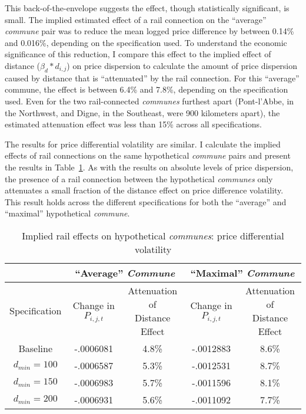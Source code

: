 \documentclass[12pt,twoside]{article}
\begin{document}
This back-of-the-envelope suggests the effect, though statistically significant, is small.
The implied estimated effect of a rail connection on the ``average'' \emph{commune} pair was to reduce the mean logged price difference by between 0.14\% and 0.016\%, depending on the specification used.
To understand the economic significance of this reduction, I compare this effect to the implied effect of distance ($\beta_d * d_{i,j}$) on price dispersion to calculate the amount of price dispersion caused by distance that is ``attenuated'' by the rail connection.
For this ``average'' commune, the effect is between 6.4\% and 7.8\%, depending on the specification used.
Even for the two rail-connected \emph{communes} furthest apart (Pont-l'Abbe, in the Northwest, and Digne, in the Southeast, were 900 kilometers apart), the estimated attenuation effect was less than 15\% across all specifications.

The results for price differential volatility are similar.
I calculate the implied effects of rail connections on the same hypothetical \emph{commune} pairs and present the results in Table~\ref{tab:treatment2}.
As with the results on absolute levels of price dispersion, the presence of a rail connection between the hypothetical \emph{communes} only attenuates a small fraction of the distance effect on price difference volatility.
This result holds across the different specifications for both the ``average'' and ``maximal'' hypothetical \emph{commune}.

\begin{table}[ht]
	\centering \caption{Implied rail effects on hypothetical \emph{communes}: price differential volatility} \label{tab:treatment2}
	\begin{tabular}{ |c|c|c|c|c| }
		\hline & \multicolumn{2}{c|}{``Average'' \emph{Commune}} & \multicolumn{2}{c|}{``Maximal'' \emph{Commune}} \\ \hline
		Specification & Change in $P_{i,j,t}$ & \shortstack{Attenuation of \\ Distance Effect} & Change in $P_{i,j,t}$ & \shortstack{Attenuation of \\ Distance Effect} \\ \hline
		Baseline & -.0006081 & 4.8\% & -.0012883 & 8.6\% \\
		$d_{min} = 100$ & -.0006587 & 5.3\% & -.0012531 & 8.7\% \\
		$d_{min} = 150$ & -.0006983 & 5.7\% & -.0011596 & 8.1\% \\
		$d_{min} = 200$ & -.0006931 & 5.6\% & -.0011092 & 7.7\% \\ \hline
	\end{tabular}
\end{table}
\end{document}
